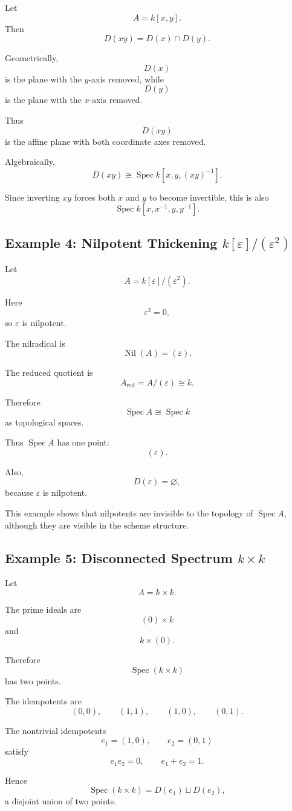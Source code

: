 \documentclass[12pt,a4paper]{article}
\newcommand{\Spec}{\operatorname{Spec}}
\newcommand{\Nil}{\operatorname{Nil}}
\begin{document}
Let
\[
A=k[x,y].
\]
Then
\[
D(xy)=D(x)\cap D(y).
\]

Geometrically,
\[
D(x)
\]
is the plane with the \(y\)-axis removed, while
\[
D(y)
\]
is the plane with the \(x\)-axis removed.

Thus
\[
D(xy)
\]
is the affine plane with both coordinate axes removed.

Algebraically,
\[
D(xy)\cong \Spec k[x,y,(xy)^{-1}].
\]

Since inverting \(xy\) forces both \(x\) and \(y\) to become invertible, this is
also
\[
\Spec k[x,x^{-1},y,y^{-1}].
\]

\subsection{Example 4: Nilpotent Thickening \(k[\varepsilon]/(\varepsilon^2)\)}

Let
\[
A=k[\varepsilon]/(\varepsilon^2).
\]

Here
\[
\varepsilon^2=0,
\]
so \(\varepsilon\) is nilpotent.

The nilradical is
\[
\Nil(A)=(\varepsilon).
\]

The reduced quotient is
\[
A_{\mathrm{red}}=A/(\varepsilon)\cong k.
\]

Therefore
\[
\Spec A\cong \Spec k
\]
as topological spaces.

Thus \(\Spec A\) has one point:
\[
(\varepsilon).
\]

Also,
\[
D(\varepsilon)=\varnothing,
\]
because \(\varepsilon\) is nilpotent.

This example shows that nilpotents are invisible to the topology of
\(\Spec A\), although they are visible in the scheme structure.

\subsection{Example 5: Disconnected Spectrum \(k\times k\)}

Let
\[
A=k\times k.
\]

The prime ideals are
\[
(0)\times k
\]
and
\[
k\times (0).
\]

Therefore
\[
\Spec(k\times k)
\]
has two points.

The idempotents are
\[
(0,0),
\qquad
(1,1),
\qquad
(1,0),
\qquad
(0,1).
\]

The nontrivial idempotents
\[
e_1=(1,0),
\qquad
e_2=(0,1)
\]
satisfy
\[
e_1e_2=0,
\qquad
e_1+e_2=1.
\]

Hence
\[
\Spec(k\times k)
=
D(e_1)\sqcup D(e_2),
\]
a disjoint union of two points.
\end{document}
